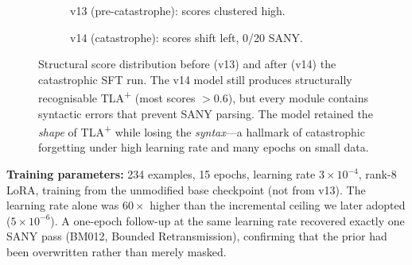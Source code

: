 \documentclass[11pt]{article}
\begin{document}
\begin{figure}[h]
\centering
\begin{subfigure}[t]{0.48\linewidth}
\centering
{}
\caption{v13 (pre-catastrophe): scores clustered high.}
\end{subfigure}\hfill
\begin{subfigure}[t]{0.48\linewidth}
\centering
{}
\caption{v14 (catastrophe): scores shift left, 0/20 SANY.}
\end{subfigure}
\caption{Structural score distribution before (v13) and after (v14) the
catastrophic SFT run.  The v14 model still produces structurally
recognisable TLA\textsuperscript{+} (most scores $>0.6$), but every
module contains syntactic errors that prevent SANY parsing.  The model
retained the \emph{shape} of TLA\textsuperscript{+} while losing the
\emph{syntax}---a hallmark of catastrophic forgetting under high
learning rate and many epochs on small data.}
\label{fig:v14-autopsy}
\end{figure}

\noindent \textbf{Training parameters:} 234 examples, 15 epochs,
learning rate $3 \times 10^{-4}$, rank-8 LoRA, training from the
unmodified base checkpoint (not from v13).  The learning rate alone
was $60\times$ higher than the incremental ceiling we later adopted
($5 \times 10^{-6}$).  A one-epoch follow-up at the same learning rate
recovered exactly one SANY pass (BM012, Bounded Retransmission), confirming
that the prior had been overwritten rather than merely masked.
\end{document}
